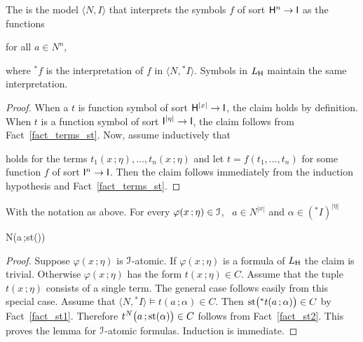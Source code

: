 \documentclass[10pt,oneside]{amsproc}
\renewcommand*{\emph}[1]{%
   \smash{\tikz[baseline]\node[rectangle, fill=teal!25, rounded corners, inner xsep=0.5ex, inner ysep=0.2ex, anchor=base, minimum height = 2.7ex]{\strut #1};}}
\begin{document}
The \emph{standard part of $\langle N,{}^*\!I\rangle$\/} is the model $\langle N,I\rangle$ that interprets the symbols $f$ of sort ${\sf H}^n\to {\sf I}$ as the functions

\hfill for all $a\in N^n$,

where ${}^*\!f$ is the interpretation of $f$ in  $\langle N,{}^*\!I\rangle$.
Symbols in $L_{\sf H}$ maintain the same interpretation.

\begin{proof}
  When a $t$ is function symbol of sort  ${\sf H}^{|x|}\to {\sf I}$, the claim holds by definition.
  When $t$ is a function symbol of sort ${\sf I}^{|\eta|}\to {\sf I}$, the claim follows from Fact~\ref{fact_terms_st}.
  Now, assume inductively that 


  holds for the terms $t_1(x\,;\eta),\dots,t_n(x\,;\eta)$ and let $t=f(t_1,\dots,t_n)$ for some function $f$ of sort ${\sf I}^n\to {\sf I}$.
  Then the claim follows immediately from the induction hypothesis and Fact~\ref{fact_terms_st}.
\end{proof}


\begin{lemma}\label{lem_st}
  With the notation as above.
  For every $\varphi(x\,;\eta)\in{\EuScript I}$, \  $a\in N^{|x|}$ and $\alpha\in({}^*\!I)^{|\eta|}$ 
  
  {\Rightarrow}
  {N\models\varphi\big(a\,;{\rm st}(\alpha)\big)}
\end{lemma}

\begin{proof}
  Suppose $\varphi(x\,;\eta)$ is ${\EuScript I}$-atomic.
  If $\varphi(x\,;\eta)$ is a formula of $L_{\sf H}$ the claim is trivial. 
  Otherwise $\varphi(x\,;\eta)$ has the form $t(x\,;\eta)\in C$.
  Assume that the tuple $t(x\,;\eta)$ consists of a single term.
  The general case follows easily from this special case. 
  Assume that $\langle N,{}^*\!I\rangle\models t(a\,;\alpha)\in C$.
  Then ${\rm st}\big({}^*t(a\,;\alpha)\big)\in C$ by Fact~\ref{fact_st1}.
  Therefore $t^N\big(a\,;{\rm st}(\alpha)\big)\in C$ follows from Fact~\ref{fact_st2}.
  This proves the lemma for ${\EuScript I}$-atomic formulas.
  Induction is immediate. 
\end{proof}
\end{document}
